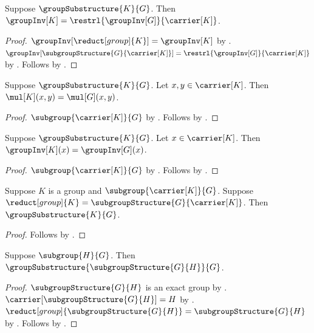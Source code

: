 \begin{proposition}\label{group_substructure_inv_graph}
    Suppose $\groupSubstructure{K}{G}$.
    Then
        $\groupInv[K]=\restrl{\groupInv[G]}{\carrier[K]}$.
\end{proposition}
\begin{proof}
    $\groupInv[\reduct[group]{K}]=\groupInv[K]$ by
        .
    $\groupInv[\subgroupStructure{G}{\carrier[K]}]
        =\restrl{\groupInv[G]}{\carrier[K]}$ by
        .
    Follows by .
\end{proof}

\begin{proposition}\label{group_substructure_mul_apply}
    Suppose $\groupSubstructure{K}{G}$.
    Let $x,y\in\carrier[K]$.
    Then $\mul[K](x,y)=\mul[G](x,y)$.
\end{proposition}
\begin{proof}
    $\subgroup{\carrier[K]}{G}$ by
        .
    Follows by
        .
\end{proof}

\begin{proposition}\label{group_substructure_inv_apply}
    Suppose $\groupSubstructure{K}{G}$.
    Let $x\in\carrier[K]$.
    Then $\groupInv[K](x)=\groupInv[G](x)$.
\end{proposition}
\begin{proof}
    $\subgroup{\carrier[K]}{G}$ by
        .
    Follows by
        .
\end{proof}

\begin{proposition}\label{group_substructure_intro}
    Suppose $K$ is a group and $\subgroup{\carrier[K]}{G}$.
    Suppose
        $\reduct[group]{K}
            =\subgroupStructure{G}{\carrier[K]}$.
    Then $\groupSubstructure{K}{G}$.
\end{proposition}
\begin{proof}
    Follows by .
\end{proof}

\begin{theorem}\label{induced_group_is_group_substructure}
    Suppose $\subgroup{H}{G}$.
    Then
        $\groupSubstructure{\subgroupStructure{G}{H}}{G}$.
\end{theorem}
\begin{proof}
    $\subgroupStructure{G}{H}$ is an exact group by
        .
    $\carrier[\subgroupStructure{G}{H}]=H$ by
        .
    $\reduct[group]{\subgroupStructure{G}{H}}
        =\subgroupStructure{G}{H}$ by
        .
    Follows by .
\end{proof}

